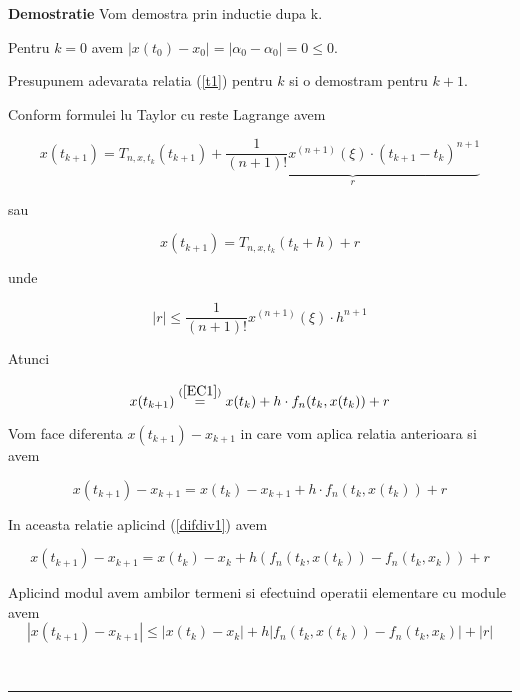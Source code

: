 \documentclass[a4paper,twoside]{book}
\newenvironment{proof}[1][Proof]{\noindent\textbf{Demostratie} }{\ \rule{0.5em}{0.5em}}
\begin{document}
\begin{proof}
Vom demostra prin inductie dupa k.

Pentru $k=0$ avem $\left\vert x(t_{0})-x_{0}\right\vert =\left\vert \alpha
_{0}-\alpha _{0}\right\vert =0\leq 0$.

Presupunem adevarata relatia (\ref{t1}) pentru $k$ si o demostram pentru $%
k+1 $.

Conform formulei lu Taylor cu reste Lagrange avem

\begin{equation*}
x(t_{k+1})=T_{n,x,t_{k}}(t_{k+1})+\underset{r}{\underbrace{\frac{1}{(n+1)!}%
x^{(n+1)}(\xi )\cdot (t_{k+1}-t_{k})^{n+1}}}
\end{equation*}

sau

\begin{equation*}
x(t_{k+1})=T_{n,x,t_{k}}(t_{k}+h)+r
\end{equation*}

unde

\begin{equation*}
|r|\leq \frac{1}{(n+1)!}x^{(n+1)}(\xi )\cdot h^{n+1}
\end{equation*}

Atunci

\begin{equation*}
x(t_{k+1})\overset{(\ref{EC1})}{=}x(t_{k})+h\cdot f_{n}(t_{k},x(t_{k}))+r
\end{equation*}

Vom face diferenta $x(t_{k+1})-x_{k+1}$ in care vom aplica relatia
anterioara si avem

\begin{equation*}
x(t_{k+1})-x_{k+1}=x(t_{k})-x_{k+1}+h\cdot f_{n}(t_{k},x(t_{k}))+r
\end{equation*}

In aceasta relatie aplicind (\ref{difdiv1}) avem

\begin{equation*}
x(t_{k+1})-x_{k+1}=x(t_{k})-x_{k}+h(f_{n}(t_{k},x(t_{k}))-f_{n}(t_{k},x_{k}))+r
\end{equation*}

Aplicind modul avem ambilor termeni si efectuind operatii elementare cu
module avem%
\begin{equation*}
\left\vert x(t_{k+1})-x_{k+1}\right\vert \leq \left\vert
x(t_{k})-x_{k}\right\vert +h\left\vert
f_{n}(t_{k},x(t_{k}))-f_{n}(t_{k},x_{k})\right\vert +|r|
\end{equation*}


\end{proof}
\end{document}
